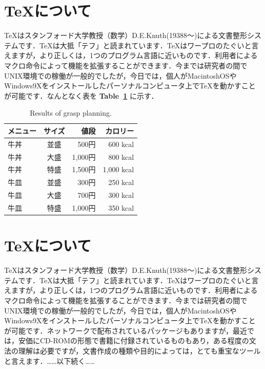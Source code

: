 \documentclass[twocolumn,10pt]{jarticle}
\begin{document}
\section{\TeX について}
TeXはスタンフォード大学教授（数学）D.E.Knuth(19388～)による文書整形システムです．TeXは大抵「テフ」と読まれています．TeXはワープロのたぐいと言えますが，より正しくは，1つのプログラム言語に近いものです．利用者によるマクロ命令によって機能を拡張することができます．今までは研究者の間でUNIX環境での稼働が一般的でしたが，今日では，個人がMacintoshOSやWindows9Xをインストールしたパーソナルコンピュータ上でTeXを動かすことが可能です．なんとなく表を {\bf Table~\ref{tb:gyudon}} に示す．
\begin{table}[H]
\caption{Results of grasp planning.}
\centering
\vspace{4mm}
  \begin{tabular}{|l|c|r||r|} \hline
    メニュー & サイズ & 値段 & カロリー \\ \hline \hline
    牛丼 & 並盛 & 500円 & 600 kcal \\
    牛丼 & 大盛 & 1,000円 & 800 kcal \\
    牛丼 & 特盛 & 1,500円 & 1,000 kcal \\ \hline
    牛皿 & 並盛 & 300円 & 250 kcal \\
    牛皿 & 大盛 & 700円 & 300 kcal \\
    牛皿 & 特盛 & 1,000円 & 350 kcal \\ \hline
  \end{tabular}
\label{tb:gyudon}
\end{table}
\section{\TeX について}
TeXはスタンフォード大学教授（数学）D.E.Knuth(19388～)による文書整形システムです．TeXは大抵「テフ」と読まれています．TeXはワープロのたぐいと言えますが，より正しくは，1つのプログラム言語に近いものです．利用者によるマクロ命令によって機能を拡張することができます．今までは研究者の間でUNIX環境での稼働が一般的でしたが，今日では，個人がMacintoshOSやWindows9Xをインストールしたパーソナルコンピュータ上でTeXを動かすことが可能です．ネットワークで配布されているパッケージもありますが，最近では，安価にCD-ROMの形態で書籍に付録されているものもあり，ある程度の文法の理解は必要ですが，文書作成の種類や目的によっては，とても重宝なツールと言えます．……以下続く……
\end{document}
